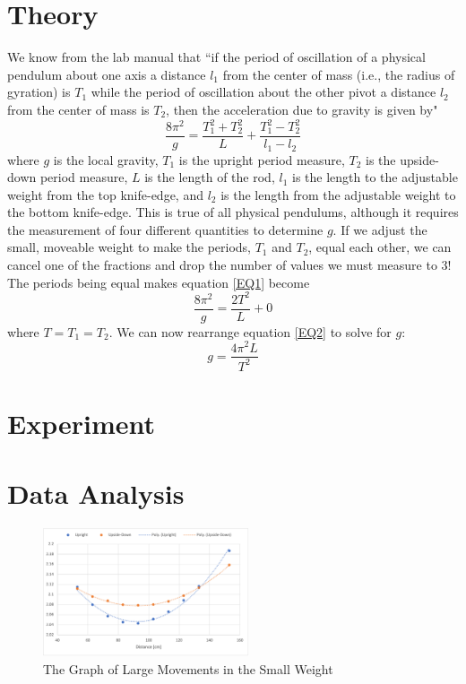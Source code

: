 \documentclass[aps,prl,10pt,twocolumn,floatfix]{revtex4-2}
\begin{document}
\section{Theory}\label{Theory}
We know from the lab manual that ``if the period of oscillation of a physical pendulum about one axis a distance $l_1$ from the center of mass (i.e., the radius of gyration) is $T_1$ while the period of oscillation about the other pivot a distance $l_2$ from the center of mass is $T_2$, then the acceleration due to gravity is given by\cite{Manual}"
\begin{equation}\label{EQ1}
\frac{8\pi^2}{g}=\frac{T_1^2+T_2^2}{L}+\frac{T_1^2-T_2^2}{l_1-l_2}
\end{equation}
where $g$ is the local gravity, $T_1$ is the upright period measure, $T_2$ is the upside-down period measure, $L$ is the length of the rod, $l_1$ is the length to the adjustable weight from the top knife-edge, and $l_2$ is the length from the adjustable weight to the bottom knife-edge. 
This is true of all physical pendulums, although it requires the measurement of four different quantities to determine $g$. 
If we adjust the small, moveable weight to make the periods, $T_1$ and $T_2$, equal each other, we can cancel one of the fractions and drop the number of values we must measure to 3!
The periods being equal makes equation \ref{EQ1} become
\begin{equation}\label{EQ2}
\frac{8\pi^2}{g}=\frac{2T^2}{L}+0
\end{equation}
where $T=T_1=T_2$.
We can now rearrange equation \ref{EQ2} to solve for $g$:
\begin{equation}
g=\frac{4\pi^2L}{T^2}
\end{equation}

\section{Experiment}

\section{Data Analysis}
\begin{figure}\label{1stGraph}
\includegraphics[width=230px]{FirstMeasurement.png}
\caption{The Graph of Large Movements in the Small Weight}
\end{figure}
\end{document}
